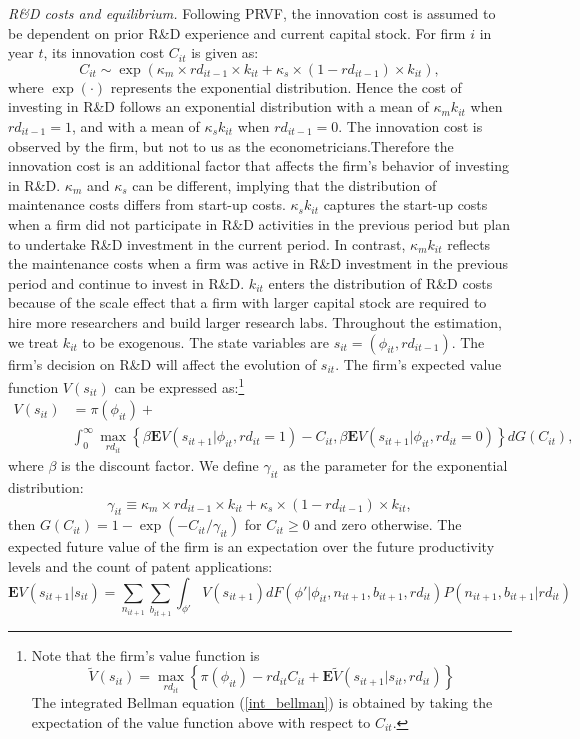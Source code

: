 \documentclass[11pt]{article}
\begin{document}
\textit{R\&D costs and equilibrium.} Following PRVF, the innovation cost is assumed to be dependent on prior R\&D experience and current capital stock. For firm $i$ in year $t$, its innovation cost $C_{it}$ is given as:
\begin{equation} \label{rd_costs}
    C_{it}\sim \exp(\kappa_m\times rd_{it-1}\times k_{it}+\kappa_{s}\times(1-rd_{it-1})\times k_{it}),
\end{equation}
where $\exp(\cdot)$ represents the exponential distribution. Hence the cost of investing in R\&D follows an exponential distribution with a mean of $\kappa_mk_{it}$ when $rd_{it-1}=1$, and with a mean of $\kappa_sk_{it}$ when $rd_{it-1}=0$. The innovation cost is observed by the firm, but not to us as the econometricians.Therefore the innovation cost is an additional factor that affects the firm's behavior of investing in R\&D. $\kappa_m$ and $\kappa_s$ can be different, implying that the distribution of
maintenance costs differs from start-up costs. $\kappa_sk_{it}$ captures the start-up costs when a firm did not participate in R\&D activities in the previous period but plan to undertake R\&D investment in the current period. In contrast, $\kappa_mk_{it}$ reflects the maintenance costs when a firm was active in R\&D investment in the previous period and continue to invest in R\&D.  $k_{it}$ enters the distribution of R\&D costs because of the scale effect that a firm with larger capital stock are required to hire more researchers and build larger research labs. Throughout the estimation, we treat $k_{it}$ to be exogenous. The state variables are $s_{it} = (\phi_{it} ,rd_{it-1})$. The firm’s decision on R\&D will affect the evolution of $s_{it}$. The firm’s expected value function $V(s_{it})$ can be expressed as:\footnote{Note that the firm's value function is
\begin{equation*}
    \tilde{V}(s_{it})=\max_{rd_{it}}\left\{\pi(\phi_{it})-rd_{it}C_{it}+\mathbf{E}\tilde{V}(s_{it+1}|s_{it},rd_{it})\right\}
\end{equation*}
The integrated Bellman equation (\ref{int_bellman}) is obtained by taking the expectation of the value function above with respect to $C_{it}$.}
\begin{align} \label{int_bellman}
    V(s_{it}) &= \pi(\phi_{it}) + \\
              &\int _0^{\infty}\max_{rd_{it}}\left\{\beta \mathbf{E} V(s_{it+1}|\phi_{it},rd_{it}=1)-C_{it}, \beta \mathbf{E}V(s_{it+1}|\phi_{it}, rd_{it}=0)\right\}dG(C_{it}), \nonumber
\end{align}
where $\beta$ is the discount factor. We define $\gamma_{it}$ as the parameter for the exponential distribution:
\[
\gamma_{it}\equiv \kappa_m\times rd_{it-1}\times k_{it}+\kappa_{s}\times(1-rd_{it-1})\times k_{it},    
\]
then $G(C_{it})=1-\exp(-C_{it}/\gamma_{it})$ for $C_{it}\geq0$ and zero otherwise. The expected future value of the firm is an expectation over the future productivity levels and the count of patent applications:
\begin{equation}\label{vf}
    \mathbf{E}V(s_{it+1}|s_{it}) = \sum_{n_{it+1}}\sum_{b_{it+1}}\int_{\phi'} V(s_{it+1})dF(\phi'|\phi_{it}, n_{it+1}, b_{it+1}, rd_{it}) P(n_{it+1}, b_{it+1}|rd_{it})
\end{equation}
\end{document}
